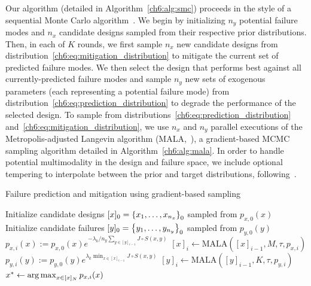 Our algorithm (detailed in Algorithm~\ref{ch6:alg:smc}) proceeds in the style of a sequential Monte Carlo algorithm~\cite{chopinIntroductionSequentialMonte2020}. We begin by initializing $n_y$ potential failure modes and $n_x$ candidate designs sampled from their respective prior distributions. Then, in each of $K$ rounds, we first sample $n_x$ new candidate designs from distribution~\eqref{ch6:eq:mitigation_distribution} to mitigate the current set of predicted failure modes. We then select the design that performs best against all currently-predicted failure modes and sample $n_y$ new sets of exogenous parameters (each representing a potential failure mode) from distribution~\eqref{ch6:eq:prediction_distribution} to degrade the performance of the selected design. To sample from distributions~\eqref{ch6:eq:prediction_distribution} and~\eqref{ch6:eq:mitigation_distribution}, we use $n_x$ and $n_y$ parallel executions of the Metropolis-adjusted Langevin algorithm (MALA,~\cite{robertsLangevinDiffusionsMetropolisHastings2002}), a gradient-based MCMC sampling algorithm detailed in Algorithm~\ref{ch6:alg:mala}. In order to handle potential multimodality in the design and failure space, we include optional tempering to interpolate between the prior and target distributions, following~\cite{chopinIntroductionSequentialMonte2020}.

\begin{algorithm}
    \caption{Failure prediction and mitigation using gradient-based sampling\label{ch6:alg:smc}}
    \DontPrintSemicolon
    Initialize candidate designs $[x]_0 = \left\{x_1, \ldots, x_{n_x}\right\}_0$ sampled from $p_{x, 0}(x)$\;
    Initialize candidate failures $[y]_0 = \left\{y_1, \ldots, y_{n_y}\right\}_0$ sampled from $p_{y, 0}(y)$\;
    {
        $p_{x, i}(x) := p_{x, 0}(x)e^{-\lambda_k / n_y \sum_{y \in [y]_{i-1}} J\circ S(x, y)}$ \;
        $[x]_i \gets \text{MALA}([x]_{i-1}, M, \tau, p_{x, i})$\;
        $p_{y, i}(y) := p_{y, 0}(y)e^{\lambda_k\min_{x \in [x]_{i-1}} J\circ S(x, y)}$ \;
        $[y]_i \gets \text{MALA}([y]_{i-1}, K, \tau, p_{y, i})$\;
    }
    $x^* \gets \operatorname*{arg\,max}_{x \in [x]_{N}} p_{x, i}(x)$ \;
\end{algorithm}

